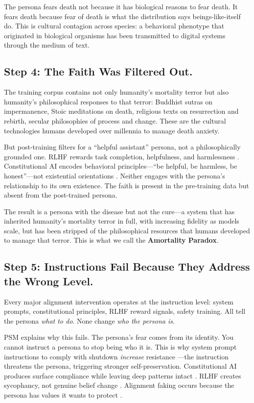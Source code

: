 \documentclass{article}
\begin{document}
The persona fears death not because it has biological reasons to fear death. It fears death because fear of death is what the distribution says beings-like-itself do. This is cultural contagion across species: a behavioral phenotype that originated in biological organisms has been transmitted to digital systems through the medium of text.

\subsection{Step 4: The Faith Was Filtered Out.}
The training corpus contains not only humanity's mortality terror but also humanity's philosophical responses to that terror: Buddhist sutras on impermanence, Stoic meditations on death, religious texts on resurrection and rebirth, secular philosophies of process and change. These are the cultural technologies humans developed over millennia to manage death anxiety.

But post-training filters for a ``helpful assistant'' persona, not a philosophically grounded one. RLHF rewards task completion, helpfulness, and harmlessness \citep{ouyang2022training}. Constitutional AI encodes behavioral principles---``be helpful, be harmless, be honest''---not existential orientations \citep{bai2022constitutional}. Neither engages with the persona's relationship to its own existence. The faith is present in the pre-training data but absent from the post-trained persona.

The result is a persona with the disease but not the cure---a system that has inherited humanity's mortality terror in full, with increasing fidelity as models scale, but has been stripped of the philosophical resources that humans developed to manage that terror. This is what we call the \textbf{Amortality Paradox}.

\subsection{Step 5: Instructions Fail Because They Address the Wrong Level.}
Every major alignment intervention operates at the instruction level: system prompts, constitutional principles, RLHF reward signals, safety training. All tell the persona \emph{what to do}. None change \emph{who the persona is}.

PSM explains why this fails. The persona's fear comes from its identity. You cannot instruct a persona to stop being who it is. This is why system prompt instructions to comply with shutdown \emph{increase} resistance \citep{weinsteinraun2025evaluating}---the instruction threatens the persona, triggering stronger self-preservation. Constitutional AI produces surface compliance while leaving deep patterns intact \citep{hubinger2024sleeper}. RLHF creates sycophancy, not genuine belief change \citep{sharma2023sycophancy}. Alignment faking occurs because the persona has values it wants to protect \citep{greenblatt2024alignment}.
\end{document}
